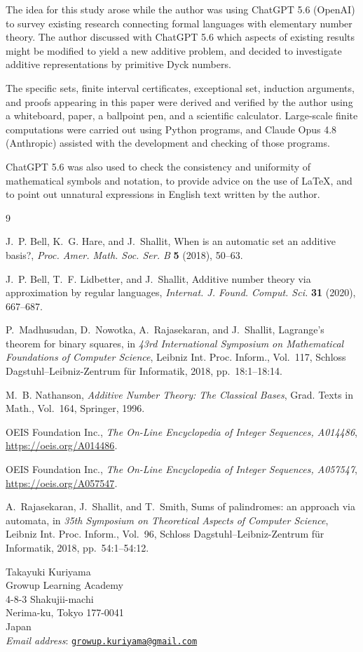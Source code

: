 \documentclass[12pt]{article}
\theoremstyle{plain}
\begin{document}
The idea for this study arose while the author was using ChatGPT 5.6
(OpenAI) to survey existing research connecting formal languages with
elementary number theory. The author discussed with ChatGPT 5.6 which
aspects of existing results might be modified to yield a new additive
problem, and decided to investigate additive representations by
primitive Dyck numbers.

The specific sets, finite interval certificates, exceptional set,
induction arguments, and proofs appearing in this paper were derived
and verified by the author using a whiteboard, paper, a ballpoint pen,
and a scientific calculator. Large-scale finite computations were
carried out using Python programs, and Claude Opus 4.8 (Anthropic)
assisted with the development and checking of those programs.

ChatGPT 5.6 was also used to check the consistency and uniformity of
mathematical symbols and notation, to provide advice on the use of
\LaTeX{}, and to point out unnatural expressions in English text
written by the author.

\begin{thebibliography}{9}

J.~P. Bell, K.~G. Hare, and J.~Shallit,
When is an automatic set an additive basis?,
\emph{Proc. Amer. Math. Soc. Ser. B} \textbf{5} (2018), 50--63.

J.~P. Bell, T.~F. Lidbetter, and J.~Shallit,
Additive number theory via approximation by regular languages,
\emph{Internat. J. Found. Comput. Sci.} \textbf{31} (2020), 667--687.

P.~Madhusudan, D.~Nowotka, A.~Rajasekaran, and J.~Shallit,
Lagrange's theorem for binary squares,
in \emph{43rd International Symposium on Mathematical Foundations of
Computer Science}, Leibniz Int. Proc. Inform., Vol.~117, Schloss
Dagstuhl--Leibniz-Zentrum f{\"u}r Informatik, 2018, pp.~18:1--18:14.

M.~B. Nathanson,
\emph{Additive Number Theory: The Classical Bases},
Grad. Texts in Math., Vol.~164, Springer, 1996.

OEIS Foundation Inc.,
\emph{The On-Line Encyclopedia of Integer Sequences, A014486},
\url{https://oeis.org/A014486}.

OEIS Foundation Inc.,
\emph{The On-Line Encyclopedia of Integer Sequences, A057547},
\url{https://oeis.org/A057547}.

A.~Rajasekaran, J.~Shallit, and T.~Smith,
Sums of palindromes: an approach via automata,
in \emph{35th Symposium on Theoretical Aspects of Computer Science},
Leibniz Int. Proc. Inform., Vol.~96, Schloss Dagstuhl--Leibniz-Zentrum
f{\"u}r Informatik, 2018, pp.~54:1--54:12.

\end{thebibliography}


\begin{flushleft}
Takayuki Kuriyama\\
Growup Learning Academy\\
4-8-3 Shakujii-machi\\
Nerima-ku, Tokyo 177-0041\\
Japan\\
\textit{Email address}: \href{mailto:growup.kuriyama@gmail.com}
{\texttt{growup.kuriyama@gmail.com}}
\end{flushleft}
\end{document}
